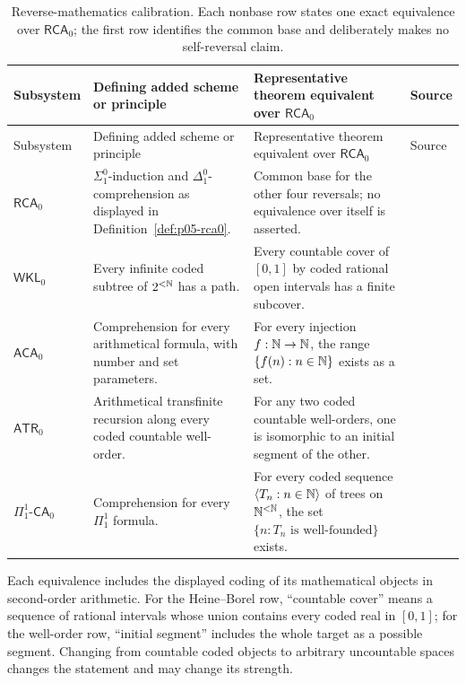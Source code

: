 \begingroup\small
\begin{longtable}{@{}p{}p{}p{}p{}@{}}
\caption{Reverse-mathematics calibration.  Each nonbase row
states one exact equivalence over \(\mathsf{RCA}_0\); the first row identifies
the common base and deliberately makes no self-reversal claim.}
\label{tab:p05-reverse-calibration}\\
\toprule
Subsystem & Defining added scheme or principle & Representative theorem
equivalent over \(\mathsf{RCA}_0\) & Source \\
\midrule
\endfirsthead
\toprule
Subsystem & Defining added scheme or principle & Representative theorem
equivalent over \(\mathsf{RCA}_0\) & Source \\
\midrule
\endhead
\(\mathsf{RCA}_0\) &
\(\Sigma^0_1\)-induction and \(\Delta^0_1\)-comprehension as displayed in
Definition~\ref{def:p05-rca0}. &
Common base for the other four reversals; no equivalence over itself is
asserted. & \cite{Simpson2009} \\
\addlinespace
\(\mathsf{WKL}_0\) &
Every infinite coded subtree of \(2^{<\mathbb{N}}\) has a path. &
Every countable cover of \([0,1]\) by coded rational open intervals has a
finite subcover. & \cite{Simpson2009} \\
\addlinespace
\(\mathsf{ACA}_0\) &
Comprehension for every arithmetical formula, with number and set parameters. &
For every injection \(f:\mathbb{N}\to\mathbb{N}\), the range
\(\{f(n):n\in\mathbb{N}\}\) exists as a set. & \cite{Simpson2009} \\
\addlinespace
\(\mathsf{ATR}_0\) &
Arithmetical transfinite recursion along every coded countable well-order. &
For any two coded countable well-orders, one is isomorphic to an initial
segment of the other. & \cite{Simpson2009} \\
\addlinespace
\(\Pi^1_1\text{-}\mathsf{CA}_0\) &
Comprehension for every \(\Pi^1_1\) formula. &
For every coded sequence \(\langle T_n:n\in\mathbb{N}\rangle\) of trees on
\(\mathbb{N}^{<\mathbb{N}}\), the set \(\{n:T_n\text{ is well-founded}\}\) exists. &
\cite{Simpson2009} \\
\bottomrule
\end{longtable}
\endgroup

Each equivalence includes the displayed coding of its mathematical objects in
second-order arithmetic.  For the Heine--Borel row, “countable cover” means a
sequence of rational intervals whose union contains every coded real in
\([0,1]\); for the well-order row, “initial segment” includes the whole target
as a possible segment.  Changing from countable coded objects to arbitrary
uncountable spaces changes the statement and may change its strength.

